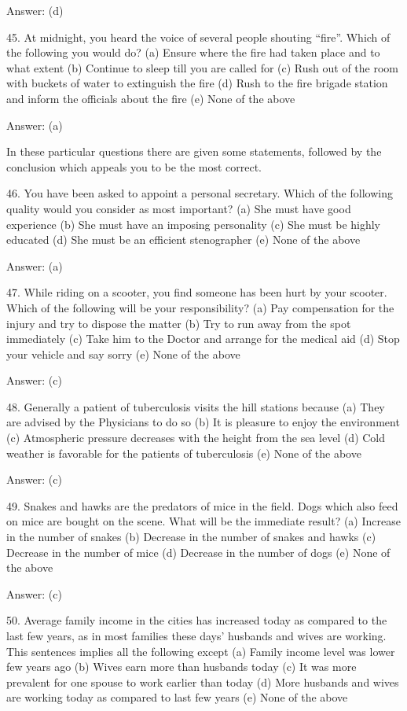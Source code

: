 Answer: (d)

45. At midnight, you heard the voice of several people shouting “fire”. Which of the following you would do?
(a) Ensure where the fire had taken place and to what extent
(b) Continue to sleep till you are called for
(c) Rush out of the room with buckets of water to extinguish the fire
(d) Rush to the fire brigade station and inform the officials about the fire
(e) None of the above

Answer: (a)


In these particular questions there are given some statements, followed by the conclusion which appeals you to be the most correct.

46. You have been asked to appoint a personal secretary. Which of the following quality would you consider as most important?
(a) She must have good experience
(b) She must have an imposing personality
(c) She must be highly educated
(d) She must be an efficient stenographer
(e) None of the above

Answer: (a)

47. While riding on a scooter, you find someone has been hurt by your scooter. Which of the following will be your responsibility?
(a) Pay compensation for the injury and try to dispose the matter
(b) Try to run away from the spot immediately
(c) Take him to the Doctor and arrange for the medical aid
(d) Stop your vehicle and say sorry
(e) None of the above

Answer: (c)

48. Generally a patient of tuberculosis visits the hill stations because
(a) They are advised by the Physicians to do so
(b) It is pleasure to enjoy the environment
(c) Atmospheric pressure decreases with the height from the sea level
(d) Cold weather is favorable for the patients of tuberculosis
(e) None of the above

Answer: (c)

49. Snakes and hawks are the predators of mice in the field. Dogs which also feed on mice are bought on the scene. What will be the immediate result?
(a) Increase in the number of snakes
(b) Decrease in the number of snakes and hawks
(c) Decrease in the number of mice
(d) Decrease in the number of dogs
(e) None of the above

Answer: (c)

50. Average family income in the cities has increased today as compared to the last few years, as in most families these days’ husbands and wives are working. This sentences implies all the following except
(a) Family income level was lower few years ago
(b) Wives earn more than husbands today
(c) It was more prevalent for one spouse to work earlier than today
(d) More husbands and wives are working today as compared to last few years
(e) None of the above


